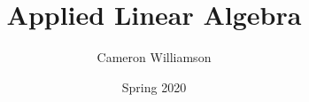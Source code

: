 \newenvironment{noot}[1]{\begin{tcolorbox}[
    arc=0mm,
    colback=white,
    colframe=white!60!black,
    title=#1,
    fonttitle=\sffamily,
    breakable
]}{\end{tcolorbox}}




\usepackage{import}
\usepackage{xifthen}
\usepackage{pdfpages}
\usepackage{transparent}
\newcommand{\incfig}[1]{%
    \def\svgwidth{\columnwidth}
    {#1.pdf_tex}
}



\title{Applied Linear Algebra}
\author{Cameron Williamson}
\date{Spring 2020}